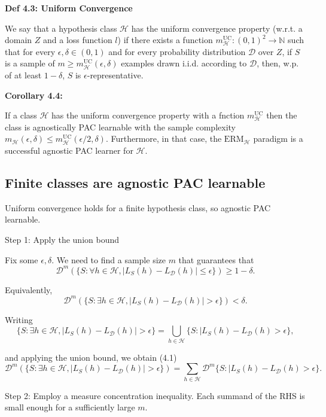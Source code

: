 \textbf{Def 4.3: Uniform Convergence}

We say that a hypothesis class $\mathcal{H}$ has the uniform convergence property (w.r.t. a domain $Z$ and a loss function $l$) if there exists a function $m_{\mathcal{H}}^{\text{UC}}: (0, 1)^2 \rightarrow \mathbb{N}$ such that for every $\epsilon, \delta \in (0, 1)$ and for every probability distribution $\mathcal{D}$ over $Z$, if $S$ is a sample of $m \geq m_{\mathcal{H}}^{\text{UC}}(\epsilon, \delta)$ examples drawn i.i.d. according to $\mathcal{D}$, then, w.p. of at least $1 - \delta$, $S$ is $\epsilon$-representative.

\textbf{Corollary 4.4:}

If a class $\mathcal{H}$ has the uniform convergence property with a fnction $m_{\mathcal{H}}^{\text{UC}}$ then the class is agnostically PAC learnable with the sample complexity $m_{\mathcal{H}}(\epsilon, \delta) \leq m_{\mathcal{H}}^{\text{UC}}(\epsilon/2, \delta)$. Furthermore, in that case, the $\textrm{ERM}_{\mathcal{H}}$ paradigm is a successful agnostic PAC learner for $\mathcal{H}$.

\subsection{Finite classes are agnostic PAC learnable}

Uniform convergence holds for a finite hypothesis class, so agnostic PAC learnable.

Step 1: Apply the union bound

Fix some $\epsilon, \delta$. We need to find a sample size $m$ that guarantees that
$$\mathcal{D}^m(\{S : \forall h \in \mathcal{H}, |L_S(h) - L_{\mathcal{D}}(h)| \leq \epsilon \}) \geq 1 - \delta.$$

Equivalently,
$$\mathcal{D}^m(\{S : \exists h \in \mathcal{H}, |L_S(h) - L_{\mathcal{D}}(h)| > \epsilon \}) < \delta.$$

Writing
$$\{S : \exists h \in \mathcal{H}, |L_S(h) - L_{\mathcal{D}}(h)| > \epsilon \} = \bigcup_{h \in \mathcal{H}} \{S : |L_S(h) - L_{\mathcal{D}}(h) > \epsilon \},$$

and applying the union bound, we obtain (4.1)
$$\mathcal{D}^m(\{S : \exists h \in \mathcal{H}, |L_S(h) - L_{\mathcal{D}}(h)| > \epsilon \}) = \sum_{h \in \mathcal{H}} \mathcal{D}^m \{S : |L_S(h) - L_{\mathcal{D}}(h) > \epsilon \}.$$

Step 2: Employ a measure concentration inequality. Each summand of the RHS is small enough for a sufficiently large $m$.

